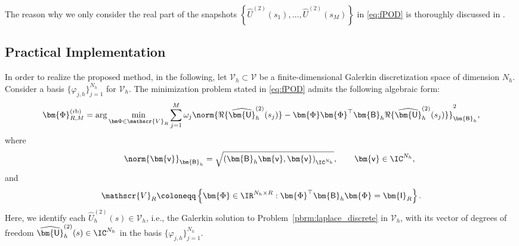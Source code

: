 \begin{remark}
The reason why we only consider the real part of the snapshots
$\left\{\widehat{U}^{(2)}(s_1) ,\dots, \widehat{U}^{(2)}(s_M)  \right\}$ in \eqref{eq:fPOD} is thoroughly discussed
in \cite[Section 5.1]{henriquez2024fast}.
\end{remark}

\subsection{Practical Implementation}
In order to realize the proposed method, in the following, let $\mathcal{V}_h \subset \mathcal{V}$ be a finite-dimensional Galerkin discretization space of dimension $N_h$. Consider a basis
$\{\varphi_{j,h}\}_{j=1}^{N_h}$ for $\mathcal{V}_h$. The minimization problem stated in
\eqref{eq:fPOD} admits the following algebraic form:
\begin{equation}\label{eq:tPOD_algebraic_frequency}
	\bm{\Phi}^{\textrm{(rb)}}_{R,M}
	=
	\arg\min_{\bm\Phi \in \mathscr{V}_{R}}
	\sum_{j=1}^{M}
	\omega_j
	\norm{
		\Re\{\widehat{\bm{\mathsf{U}}}_h^{(2)}(s_j)\}
		-
		\bm{\Phi}\bm{\Phi}^\top
		\bm{\mathsf{B}}_h
		\Re\{\widehat{\bm{\mathsf{U}}}_h^{(2)}(s_j)\}
	}^2_{\bm{\mathsf{B}}_h},
\end{equation}
where
\begin{equation}\tag*{}
	\norm{\bm{\mathsf{v}}}_{\bm{\mathsf{B}}_h}
	=
	\sqrt{
		\left(\bm{\mathsf{B}}_h\bm{\mathsf{v}},\bm{\mathsf{v}}\right)_{\IC^{N_h}}
	},
	\qquad
	\bm{\mathsf{v}} \in \IC^{N_h},
\end{equation}
and
\begin{equation}
	\mathscr{V}_{R}
	\coloneqq
	\left\{
		\bm{\Phi} \in \IR^{N_h \times R}:
		\bm{\Phi}^\top \bm{\mathsf{B}}_h \bm{\Phi} = \bm{\mathsf{I}}_{R}
	\right\}.
\end{equation}
Here, we identify each $\widehat{U}^{(2)}_h(s)\in \mathcal{V}_h$, i.e., the Galerkin solution to
Problem~\ref{pbrm:laplace_discrete} in $\mathcal{V}_h$, with its vector of degrees of freedom
$\widehat{\bm{\mathsf{U}}}_h^{(2)}(s) \in \IC^{N_h}$ in the basis $\{\varphi_{j,h}\}_{j=1}^{N_h}$.

